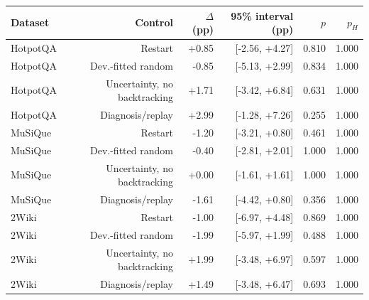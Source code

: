 \begin{tabular}{@{}lrrrrr@{}}
\toprule
Dataset & Control & $\Delta$ (pp) & 95\% interval (pp) & $p$ & $p_H$ \\
\midrule
HotpotQA & Restart & +0.85 & [-2.56, +4.27] & 0.810 & 1.000 \\
HotpotQA & Dev.-fitted random & -0.85 & [-5.13, +2.99] & 0.834 & 1.000 \\
HotpotQA & Uncertainty, no backtracking & +1.71 & [-3.42, +6.84] & 0.631 & 1.000 \\
HotpotQA & Diagnosis/replay & +2.99 & [-1.28, +7.26] & 0.255 & 1.000 \\
MuSiQue & Restart & -1.20 & [-3.21, +0.80] & 0.461 & 1.000 \\
MuSiQue & Dev.-fitted random & -0.40 & [-2.81, +2.01] & 1.000 & 1.000 \\
MuSiQue & Uncertainty, no backtracking & +0.00 & [-1.61, +1.61] & 1.000 & 1.000 \\
MuSiQue & Diagnosis/replay & -1.61 & [-4.42, +0.80] & 0.356 & 1.000 \\
2Wiki & Restart & -1.00 & [-6.97, +4.48] & 0.869 & 1.000 \\
2Wiki & Dev.-fitted random & -1.99 & [-5.97, +1.99] & 0.488 & 1.000 \\
2Wiki & Uncertainty, no backtracking & +1.99 & [-3.48, +6.97] & 0.597 & 1.000 \\
2Wiki & Diagnosis/replay & +1.49 & [-3.48, +6.47] & 0.693 & 1.000 \\
\bottomrule
\end{tabular}
